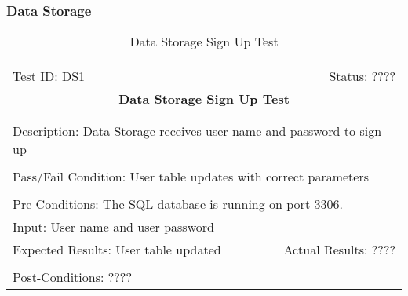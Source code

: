 \documentclass[11pt]{article}
\begin{document}
\subsubsection{Data Storage} %
\begin{center}
\begin{table}[H]
\begin{tabular}{|l r|}\hline&\\[-2mm]
	Test ID: DS1	&Status: ????\\[-3mm]
	\multicolumn{2}{|c|}{\textbf{\large{Data Storage Sign Up Test}}}\\&\\\hline&\\[-3mm]
	\multicolumn{2}{|p{\textwidth}|}{Description: Data Storage receives user name and password to sign up}\\[1mm]\hline&\\[-3mm]
	\multicolumn{2}{|p{\textwidth}|}{Pass/Fail Condition: User table updates with correct parameters}\\[1mm]\hline&\\[-3mm]
	\multicolumn{2}{|p{\textwidth}|}{Pre-Conditions: The SQL database is running on port 3306.}\\[4mm]
	\multicolumn{2}{|p{\textwidth}|}{Input: User name and user password}\\[2mm]\hline
	\multicolumn{1}{|p{0.49\textwidth}}{Expected Results: User table updated}	&\multicolumn{1}{|p{0.45\textwidth}|}{Actual Results: ????}\\\hline&\\[-3mm]
	\multicolumn{2}{|p{\textwidth}|}{Post-Conditions: ????}\\\hline
\end{tabular}
\caption{Data Storage Sign Up Test}
\end{table}
\end{center}
\end{document}
